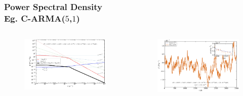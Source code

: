 \documentclass[hyperref={pdfpagelabels=false}]{beamer}
\begin{document}
\begin{frame}
\frametitle{Power Spectral Density\\Eg. C-ARMA($5$,$1$)}
  \begin{columns}
    \begin{column}{0.5\textwidth}
      \begin{figure}
        \includegraphics[scale=0.04]{images/CARMA(5,1)_PSD.jpg}
      \end{figure}
    \end{column}
    \begin{column}{0.5\textwidth}
      \begin{figure}
        \includegraphics[scale=0.04]{images/CARMA(5,1)_LC.jpg}
      \end{figure}
    \end{column}
  \end{columns}
\end{frame}
\end{document}
